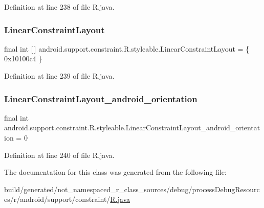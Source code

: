 Definition at line 238 of file R.\+java.

\mbox{\label{classandroid_1_1support_1_1constraint_1_1_r_1_1styleable_a3d1d810f2c6279b4ff255b6cd87b7b52}} 
\subsubsection{\texorpdfstring{LinearConstraintLayout}{LinearConstraintLayout}}
{\footnotesize\ttfamily final int \mbox{[}$\,$\mbox{]} android.\+support.\+constraint.\+R.\+styleable.\+Linear\+Constraint\+Layout = \{ 0x10100c4 \}\hspace{0.3cm}{\ttfamily [static]}}



Definition at line 239 of file R.\+java.

\mbox{\label{classandroid_1_1support_1_1constraint_1_1_r_1_1styleable_ab75931ca103e38ee68ee432610b0520c}} 
\subsubsection{\texorpdfstring{LinearConstraintLayout\_android\_orientation}{LinearConstraintLayout\_android\_orientation}}
{\footnotesize\ttfamily final int android.\+support.\+constraint.\+R.\+styleable.\+Linear\+Constraint\+Layout\+\_\+android\+\_\+orientation = 0\hspace{0.3cm}{\ttfamily [static]}}



Definition at line 240 of file R.\+java.



The documentation for this class was generated from the following file\+:\begin{DoxyCompactItemize}
\item 
build/generated/not\+\_\+namespaced\+\_\+r\+\_\+class\+\_\+sources/debug/process\+Debug\+Resources/r/android/support/constraint/\mbox{\hyperlink{android_2support_2constraint_2_r_8java}{R.\+java}}\end{DoxyCompactItemize}
